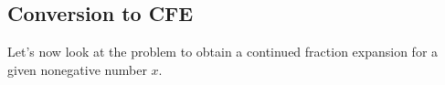 



%


\subsection{Conversion to CFE}
Let's now look at the problem to obtain a continued fraction expansion for a given nonegative number $x$.


